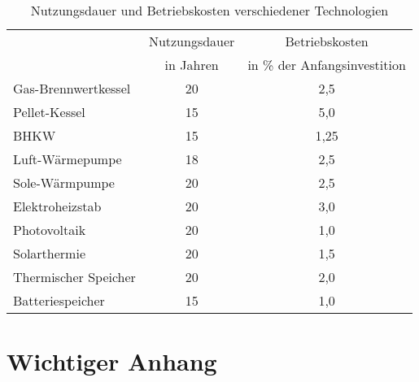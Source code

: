 \begin{table}[H]\centering
\begin{tabular}{|l|c|c|}
\hline
\rowcolor[HTML]{C0C0C0} 
\cellcolor[HTML]{C0C0C0}                              & Nutzungsdauer & Betriebskosten               \\ \cline{2-3} 
\rowcolor[HTML]{C0C0C0} 
\multirow{-2}{*}{\cellcolor[HTML]{C0C0C0}Technologie} & in Jahren     & in \% der Anfangsinvestition \\ \hline
Gas-Brennwertkessel                                   & 20            & 2,5                          \\ \hline
\rowcolor[HTML]{EFEFEF} 
Pellet-Kessel                                         & 15            & 5,0                          \\ \hline
BHKW                                                  & 15            & 1,25                         \\ \hline
\rowcolor[HTML]{EFEFEF} 
Luft-Wärmepumpe                                       & 18            & 2,5                          \\ \hline
Sole-Wärmpumpe                                        & 20            & 2,5                          \\ \hline
\rowcolor[HTML]{EFEFEF} 
Elektroheizstab                                       & 20            & 3,0                          \\ \hline
Photovoltaik                                          & 20            & 1,0                          \\ \hline
\rowcolor[HTML]{EFEFEF} 
Solarthermie                                          & 20            & 1,5                          \\ \hline
Thermischer Speicher                                  & 20            & 2,0                          \\ \hline
\rowcolor[HTML]{EFEFEF} 
Batteriespeicher                                      & 15            & 1,0                          \\ \hline
\end{tabular}
\caption{Nutzungsdauer und Betriebskosten verschiedener Technologien}
\label{tab: TabelleA5}
\end{table}

\chapter{Wichtiger Anhang}
